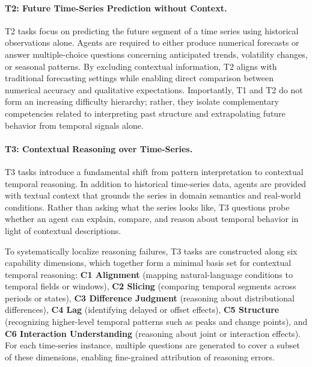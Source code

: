 \paragraph{T2: Future Time-Series Prediction without Context.}
T2 tasks focus on predicting the future segment of a time series using historical observations alone.
Agents are required to either produce numerical forecasts or answer multiple-choice questions concerning anticipated trends, volatility changes, or seasonal patterns.
By excluding contextual information, T2 aligns with traditional forecasting settings while enabling direct comparison between numerical accuracy and qualitative expectations.
Importantly, T1 and T2 do not form an increasing difficulty hierarchy; rather, they isolate complementary competencies related to interpreting past structure and extrapolating future behavior from temporal signals alone.

\paragraph{T3: Contextual Reasoning over Time-Series.}
T3 tasks introduce a fundamental shift from pattern interpretation to contextual temporal reasoning.
In addition to historical time-series data, agents are provided with textual context that grounds the series in domain semantics and real-world conditions.
Rather than asking what the series looks like, T3 questions probe whether an agent can explain, compare, and reason about temporal behavior in light of contextual descriptions.

To systematically localize reasoning failures, T3 tasks are constructed along six capability dimensions, which together form a minimal basis set for contextual temporal reasoning:
\textbf{C1 Alignment} (mapping natural-language conditions to temporal fields or windows),
\textbf{C2 Slicing} (comparing temporal segments across periods or states),
\textbf{C3 Difference Judgment} (reasoning about distributional differences),
\textbf{C4 Lag} (identifying delayed or offset effects),
\textbf{C5 Structure} (recognizing higher-level temporal patterns such as peaks and change points), and
\textbf{C6 Interaction Understanding} (reasoning about joint or interaction effects).
For each time-series instance, multiple questions are generated to cover a subset of these dimensions, enabling fine-grained attribution of reasoning errors.

